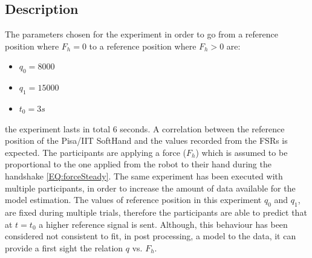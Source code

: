 \subsection{Description}
The parameters chosen for the experiment in order to go from a reference position where $F_h=0$ to a reference position where $F_h > 0$ are:
\begin{itemize}
\item $q_0 = 8000 $
\item $q_1 = 15000$
\item $t_0 = 3s$
\end{itemize}
the experiment lasts in total 6 seconds. A correlation between the reference position of the Pisa/IIT SoftHand and the values recorded from the FSRs is expected. The participants are applying a force ($F_{h}$) which is assumed to be proportional to the one applied from the robot to their hand during the handshake \ref{EQ:forceSteady}.
The same experiment has been executed with multiple participants, in order to increase the amount of data available for the model estimation. The values of reference position in this experiment $q_{0}$ and $q_{1}$, are fixed during multiple trials, therefore the participants are able to predict that at $t=t_0$ a higher reference signal is sent. Although, this behaviour has been considered not consistent to fit, in post processing, a model to the data, it can provide a first sight the relation $q$ vs. $F_h$.
%
%
